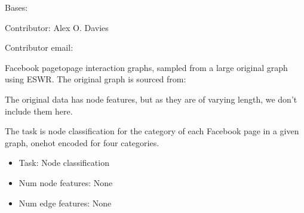 \documentclass[letterpaper,10pt,english]{sphinxhowto}
\begin{document}

\begin{fulllineitems}
\label{\detokenize{datasets/real:datasets.real.FacebookDataset}}
\pysigstartsignatures
{}
\pysigstopsignatures
\sphinxAtStartPar
Bases: 

\sphinxAtStartPar
Contributor: Alex O. Davies

\sphinxAtStartPar
Contributor email: 

\sphinxAtStartPar
Facebook page\sphinxhyphen{}to\sphinxhyphen{}page interaction graphs, sampled from a large original graph using ESWR.
The original graph is sourced from:
\begin{quote}

\sphinxAtStartPar
{}
\end{quote}

\sphinxAtStartPar
The original data has node features, but as they are of varying length, we don’t include them here.

\sphinxAtStartPar
The task is node classification for the category of each Facebook page in a given graph, one\sphinxhyphen{}hot encoded for four categories.
\begin{itemize}
\item {} 
\sphinxAtStartPar
Task: Node classification

\item {} 
\sphinxAtStartPar
Num node features: None

\item {} 
\sphinxAtStartPar
Num edge features: None


\end{itemize}
\end{fulllineitems}
\end{document}
